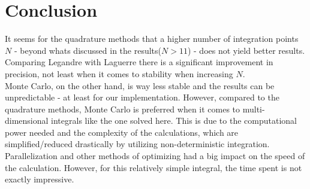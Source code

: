 \documentclass[../main.tex]{subfiles}
\begin{document}
\section{Conclusion} \label{sec:conclusion}
It seems for the quadrature methods that a higher number of integration points $N$ - beyond whats discussed in the results($N> 11$) - does not yield better results. Comparing Legandre with Laguerre there is a significant improvement in precision, not least when it comes to stability when increasing $N$. \\

Monte Carlo, on the other hand, is way less stable and the results can be unpredictable - at least for our implementation. However, compared to the quadrature methods, Monte Carlo is preferred when it comes to multi-dimensional integrals like the one solved here. This is due to the computational power needed and the complexity of the calculations, which are simplified/reduced drastically by utilizing non-deterministic integration. \\

Parallelization and other methods of optimizing had a big impact on the speed of the calculation. However, for this relatively simple integral, the time spent is not exactly impressive.
\end{document}
